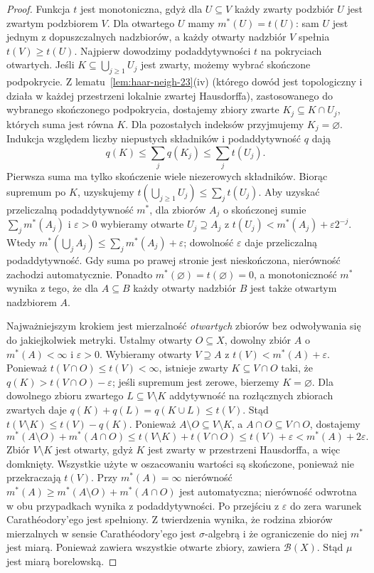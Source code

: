 \begin{proof}
Funkcja $t$ jest monotoniczna, gdyż dla $U\subseteq V$
każdy zwarty podzbiór $U$ jest zwartym podzbiorem $V$.
Dla otwartego $U$ mamy $m^*(U)=t(U)$: sam $U$ jest
jednym z dopuszczalnych nadzbiorów, a każdy otwarty
nadzbiór $V$ spełnia $t(V)\ge t(U)$.
Najpierw dowodzimy podaddytywności $t$ na pokryciach
otwartych. Jeśli $K\subseteq\bigcup_{j\ge1}U_j$ jest
zwarty, możemy wybrać skończone podpokrycie.
Z lematu~\ref{lem:haar-neigh-23}(iv) (którego dowód
jest topologiczny i działa w każdej przestrzeni lokalnie
zwartej Hausdorffa), zastosowanego do wybranego
skończonego podpokrycia, dostajemy zbiory zwarte
$K_j\subseteq K\cap U_j$, których suma jest równa $K$.
Dla pozostałych indeksów przyjmujemy $K_j=\varnothing$.
Indukcja względem liczby niepustych składników i
podaddytywność $q$ dają
\[
 q(K)\le\sum_jq(K_j)\le\sum_jt(U_j).
\]
Pierwsza suma ma tylko skończenie wiele niezerowych
składników. Biorąc supremum po $K$,
uzyskujemy
$t(\bigcup_{j\ge1}U_j)\le\sum_jt(U_j)$.
Aby uzyskać przeliczalną podaddytywność $m^*$,
dla zbiorów $A_j$ o skończonej sumie $\sum_jm^*(A_j)$
i $\varepsilon>0$ wybieramy otwarte $U_j\supseteq A_j$
z $t(U_j)<m^*(A_j)+\varepsilon2^{-j}$.
Wtedy $m^*(\bigcup_jA_j)\le\sum_jm^*(A_j)+\varepsilon$;
dowolność $\varepsilon$ daje przeliczalną podaddytywność.
Gdy suma po prawej stronie jest nieskończona, nierówność
zachodzi automatycznie. Ponadto $m^*(\varnothing)=t(\varnothing)=0$,
a monotoniczność $m^*$ wynika z tego, że dla $A\subseteq B$
każdy otwarty nadzbiór $B$ jest także otwartym nadzbiorem $A$.

Najważniejszym krokiem jest mierzalność \emph{otwartych}
zbiorów bez odwoływania się do jakiejkolwiek metryki.
Ustalmy otwarty $O\subseteq X$, dowolny zbiór $A$
o $m^*(A)<\infty$ i $\varepsilon>0$.
Wybieramy otwarty $V\supseteq A$ z
$t(V)<m^*(A)+\varepsilon$. Ponieważ
$t(V\cap O)\le t(V)<\infty$, istnieje zwarty
$K\subseteq V\cap O$ taki, że
$q(K)>t(V\cap O)-\varepsilon$; jeśli supremum
jest zerowe, bierzemy $K=\varnothing$.
Dla dowolnego zbioru zwartego $L\subseteq V\setminus K$
addytywność na rozłącznych zbiorach zwartych daje
$q(K)+q(L)=q(K\cup L)\le t(V)$.
Stąd $t(V\setminus K)\le t(V)-q(K)$.
Ponieważ $A\setminus O\subseteq V\setminus K$,
a $A\cap O\subseteq V\cap O$, dostajemy
\[
 m^*(A\setminus O)+m^*(A\cap O)
 \le t(V\setminus K)+t(V\cap O)
 \le t(V)+\varepsilon<m^*(A)+2\varepsilon.
\]
Zbiór $V\setminus K$ jest otwarty, gdyż $K$ jest
zwarty w przestrzeni Hausdorffa, a więc domknięty.
Wszystkie użyte w oszacowaniu wartości są skończone,
ponieważ nie przekraczają $t(V)$.
Przy $m^*(A)=\infty$ nierówność
$m^*(A)\ge m^*(A\setminus O)+m^*(A\cap O)$
jest automatyczna; nierówność odwrotna w obu
przypadkach wynika z podaddytywności.
Po przejściu z $\varepsilon$ do zera warunek
Carathéodory'ego jest spełniony. Z twierdzenia
wynika, że rodzina zbiorów mierzalnych w sensie
Carathéodory'ego jest $\sigma$-algebrą i że
ograniczenie do niej $m^*$ jest miarą. Ponieważ
zawiera wszystkie otwarte zbiory, zawiera
$\mathcal B(X)$. Stąd $\mu$ jest miarą borelowską.


\end{proof}
